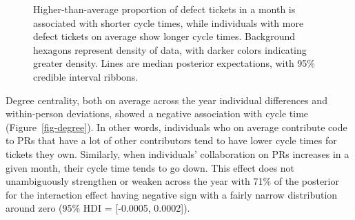 \documentclass[
  sn-mathphys-ay,
]{sn-jnl}
\begin{document}
\begin{figure}


\caption[Higher-than-average proportion of defect tickets in a month is
associated with shorter cycle times, while individuals with more defect
tickets on average show longer cycle
times]{\label{fig-defecttickets}Higher-than-average proportion of defect
tickets in a month is associated with shorter cycle times, while
individuals with more defect tickets on average show longer cycle times.
Background hexagons represent density of data, with darker colors
indicating greater density. Lines are median posterior expectations,
with 95\% credible interval ribbons.}

\end{figure}%

Degree centrality, both on average across the year individual
differences and within-person deviations, showed a negative association
with cycle time (Figure~\ref{fig-degree}). In other words, individuals
who on average contribute code to PRs that have a lot of other
contributors tend to have lower cycle times for tickets they own.
Similarly, when individuals' collaboration on PRs increases in a given
month, their cycle time tends to go down. This effect does not
unambiguously strengthen or weaken across the year with 71\% of the
posterior for the interaction effect having negative sign with a fairly
narrow distribution around zero (95\% HDI = {[}-0.0005, 0.0002{]}).
\end{document}
